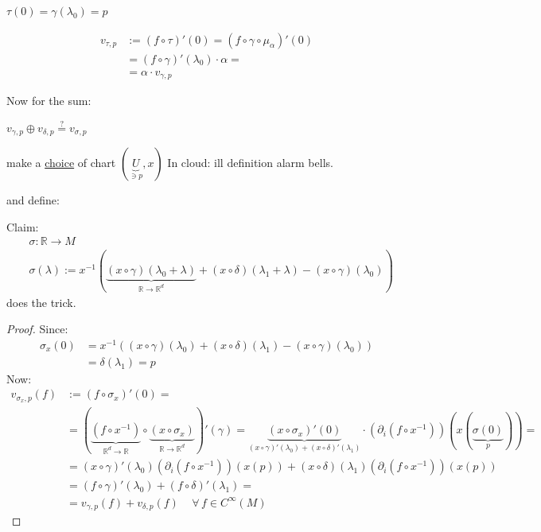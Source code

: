 \documentclass[10pt]{amsart}
\begin{document}
\begin{multicols*}{2}
	$\tau(0) = \gamma(\lambda_0) =p$
	
	\[
	\begin{aligned}
	v_{\tau,p} & := (f\circ \tau)'(0) = (f\circ \gamma \circ \mu_{\alpha} )'(0) \\ 
	& =  (f\circ \gamma)'(\lambda_0) \cdot \alpha = \\
	& = \alpha \cdot v_{\gamma,p}
	\end{aligned}
	\]
	
	Now for the sum: %
	
	$v_{\gamma,p} \oplus v_{\delta,p} \overset{?}{=} v_{\sigma, p} $
	
	make a \underline{choice} of chart $(\underbrace{U}_{\ni p} , x)$  In cloud: ill definition alarm bells. 
	
	and define:
	
	Claim:
	\[
	\begin{aligned}
	& \sigma : \mathbb{R} \to M \\
	& \sigma(\lambda) := x^{-1}( \underbrace{ (x\circ \gamma)(\lambda_0 + \lambda)}_{\mathbb{R} \to \mathbb{R}^d}  + (x\circ \delta)(\lambda_1+ \lambda) - (x\circ \gamma)(\lambda_0) )
	\end{aligned}
	\]
	does the trick.
	\begin{proof}
		Since: 
		\[
		\begin{aligned}
		\sigma_x(0) & = x^{-1}((x\circ \gamma)(\lambda_0) + (x\circ \delta)(\lambda_1) - (x\circ \gamma)(\lambda_0)) \\
		& = \delta(\lambda_1) = p \end{aligned}
		\]
		Now:
		\[
		\begin{aligned}
		v_{\sigma_x,p}(f) & := (f\circ \sigma_x)'(0) =  \\ 
		& = ( \underbrace{ (f\circ x^{-1}) }_{\mathbb{R}^d \to \mathbb{R}}  \circ \underbrace{ (x\circ \sigma_x) }_{\mathbb{R} \to \mathbb{R}^d}  )'(\gamma) = \underbrace{ (x\circ \sigma_x)'(0) }_{(x\circ \gamma)'(\lambda_0) + (x\circ \delta)'(\lambda_1) } \cdot \left( \partial_i (f\circ x^{-1}) \right)(x( \underbrace{ \sigma(0)}_{p} ) ) = \\
		& = (x\circ \gamma)'(\lambda_0)(\partial_i (f\circ x^{-1}) )(x(p)) + (x\circ \delta)(\lambda_1)(\partial_i (f\circ x^{-1})  )(x(p)) \\
		& = (f\circ \gamma)'(\lambda_0) + (f\circ \delta)'(\lambda_1) = \\
		& = v_{\gamma,p}(f) + v_{\delta,p}(f) \quad \, \forall \, f \in C^{\infty}(M)
		\end{aligned}
		\]
		

\end{proof}
\end{multicols*}
\end{document}
